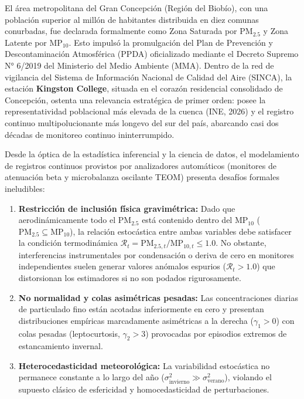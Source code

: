 \documentclass[10pt,twocolumn,a4paper]{article}
\begin{document}
El área metropolitana del Gran Concepción (Región del Biobío), con una población superior al millón de habitantes distribuida en diez comunas conurbadas, fue declarada formalmente como Zona Saturada por $\text{PM}_{2.5}$ y Zona Latente por $\text{MP}_{10}$. Esto impulsó la promulgación del Plan de Prevención y Descontaminación Atmosférica (PPDA) oficializado mediante el Decreto Supremo N° 6/2019 del Ministerio del Medio Ambiente (MMA). Dentro de la red de vigilancia del Sistema de Información Nacional de Calidad del Aire (SINCA), la estación \textbf{Kingston College}, situada en el corazón residencial consolidado de Concepción, ostenta una relevancia estratégica de primer orden: posee la representatividad poblacional más elevada de la cuenca (INE, 2026) y el registro continuo multipolucionante más longevo del sur del país, abarcando casi dos décadas de monitoreo continuo ininterrumpido.

Desde la óptica de la estadística inferencial y la ciencia de datos, el modelamiento de registros continuos provistos por analizadores automáticos (monitores de atenuación beta y microbalanza oscilante TEOM) presenta desafíos formales ineludibles:
\begin{enumerate}
    \item \textbf{Restricción de inclusión física gravimétrica:} Dado que aerodinámicamente todo el $\text{PM}_{2.5}$ está contenido dentro del $\text{MP}_{10}$ ($\text{PM}_{2.5} \subseteq \text{MP}_{10}$), la relación estocástica entre ambas variables debe satisfacer la condición termodinámica $\mathcal{R}_t = \text{PM}_{2.5,t}/\text{MP}_{10,t} \le 1.0$. No obstante, interferencias instrumentales por condensación o deriva de cero en monitores independientes suelen generar valores anómalos espurios ($\mathcal{R}_t > 1.0$) que distorsionan los estimadores si no son podados rigurosamente.
    \item \textbf{No normalidad y colas asimétricas pesadas:} Las concentraciones diarias de particulado fino están acotadas inferiormente en cero y presentan distribuciones empíricas marcadamente asimétricas a la derecha ($\gamma_1 > 0$) con colas pesadas (leptocurtosis, $\gamma_2 > 3$) provocadas por episodios extremos de estancamiento invernal.
    \item \textbf{Heterocedasticidad meteorológica:} La variabilidad estocástica no permanece constante a lo largo del año ($\sigma^2_{\text{invierno}} \gg \sigma^2_{\text{verano}}$), violando el supuesto clásico de esfericidad y homocedasticidad de perturbaciones.
\end{enumerate}
\end{document}
